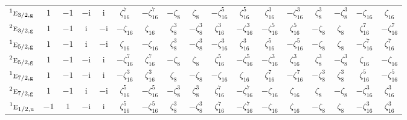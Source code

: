 \documentclass[10pt,a4paper]{article}
\numberwithin{equation}{section}
\newcommand{\irr}[1]{\text{\normalfont\scshape #1}}
\newcommand{\conjpair}[1]{{}^{#1}}
\newcommand{\ptag}[1]{\mathrm{#1}}
\newcommand{\iunit}{\mathrm{i}}
\newcommand{\rootunity}[1]{\zeta_{#1}}
\begin{document}
{\begin{longtable}{@{}lcccccccccccccccc@{}}
$\conjpair{1}\irr{e}_{3/2,\ptag{g}}$ & $1$ & $-1$ & $-\iunit{}$ & $\iunit{}$ & $\rootunity{16}^{7}$ & $-\rootunity{16}^{7}$ & $-\rootunity{8}$ & $\rootunity{8}$ & $-\rootunity{16}^{5}$ & $\rootunity{16}^{5}$ & $\rootunity{16}^{3}$ & $-\rootunity{16}^{3}$ & $\rootunity{8}^{3}$ & $-\rootunity{8}^{3}$ & $-\rootunity{16}$ & $\rootunity{16}$\\
$\conjpair{2}\irr{e}_{3/2,\ptag{g}}$ & $1$ & $-1$ & $\iunit{}$ & $-\iunit{}$ & $-\rootunity{16}$ & $\rootunity{16}$ & $\rootunity{8}^{3}$ & $-\rootunity{8}^{3}$ & $\rootunity{16}^{3}$ & $-\rootunity{16}^{3}$ & $-\rootunity{16}^{5}$ & $\rootunity{16}^{5}$ & $-\rootunity{8}$ & $\rootunity{8}$ & $\rootunity{16}^{7}$ & $-\rootunity{16}^{7}$\\
$\conjpair{1}\irr{e}_{5/2,\ptag{g}}$ & $1$ & $-1$ & $\iunit{}$ & $-\iunit{}$ & $\rootunity{16}$ & $-\rootunity{16}$ & $\rootunity{8}^{3}$ & $-\rootunity{8}^{3}$ & $-\rootunity{16}^{3}$ & $\rootunity{16}^{3}$ & $\rootunity{16}^{5}$ & $-\rootunity{16}^{5}$ & $-\rootunity{8}$ & $\rootunity{8}$ & $-\rootunity{16}^{7}$ & $\rootunity{16}^{7}$\\
$\conjpair{2}\irr{e}_{5/2,\ptag{g}}$ & $1$ & $-1$ & $-\iunit{}$ & $\iunit{}$ & $-\rootunity{16}^{7}$ & $\rootunity{16}^{7}$ & $-\rootunity{8}$ & $\rootunity{8}$ & $\rootunity{16}^{5}$ & $-\rootunity{16}^{5}$ & $-\rootunity{16}^{3}$ & $\rootunity{16}^{3}$ & $\rootunity{8}^{3}$ & $-\rootunity{8}^{3}$ & $\rootunity{16}$ & $-\rootunity{16}$\\
$\conjpair{1}\irr{e}_{7/2,\ptag{g}}$ & $1$ & $-1$ & $-\iunit{}$ & $\iunit{}$ & $-\rootunity{16}^{3}$ & $\rootunity{16}^{3}$ & $\rootunity{8}$ & $-\rootunity{8}$ & $-\rootunity{16}$ & $\rootunity{16}$ & $\rootunity{16}^{7}$ & $-\rootunity{16}^{7}$ & $-\rootunity{8}^{3}$ & $\rootunity{8}^{3}$ & $\rootunity{16}^{5}$ & $-\rootunity{16}^{5}$\\
$\conjpair{2}\irr{e}_{7/2,\ptag{g}}$ & $1$ & $-1$ & $\iunit{}$ & $-\iunit{}$ & $\rootunity{16}^{5}$ & $-\rootunity{16}^{5}$ & $-\rootunity{8}^{3}$ & $\rootunity{8}^{3}$ & $\rootunity{16}^{7}$ & $-\rootunity{16}^{7}$ & $-\rootunity{16}$ & $\rootunity{16}$ & $\rootunity{8}$ & $-\rootunity{8}$ & $-\rootunity{16}^{3}$ & $\rootunity{16}^{3}$\\
$\conjpair{1}\irr{e}_{1/2,\ptag{u}}$ & $-1$ & $1$ & $-\iunit{}$ & $\iunit{}$ & $\rootunity{16}^{5}$ & $-\rootunity{16}^{5}$ & $\rootunity{8}^{3}$ & $-\rootunity{8}^{3}$ & $\rootunity{16}^{7}$ & $-\rootunity{16}^{7}$ & $-\rootunity{16}$ & $\rootunity{16}$ & $-\rootunity{8}$ & $\rootunity{8}$ & $-\rootunity{16}^{3}$ & $\rootunity{16}^{3}$\\

\end{longtable}}
\end{document}
